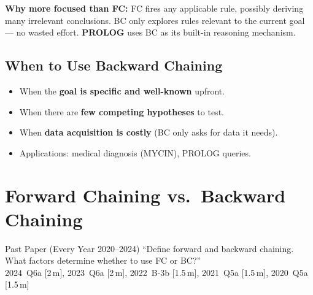 \documentclass[12pt,a4paper]{article}
\begin{document}
\textbf{Why more focused than FC:}
FC fires any applicable rule, possibly deriving many irrelevant conclusions.
BC only explores rules relevant to the current goal --- no wasted effort.
\textbf{PROLOG} uses BC as its built-in reasoning mechanism.

\subsection{When to Use Backward Chaining}

\begin{itemize}
  \item When the \textbf{goal is specific and well-known} upfront.
  \item When there are \textbf{few competing hypotheses} to test.
  \item When \textbf{data acquisition is costly} (BC only asks for data it needs).
  \item Applications: medical diagnosis (MYCIN), PROLOG queries.
\end{itemize}

\section{Forward Chaining vs.\ Backward Chaining}

\begin{exambox}{Past Paper (Every Year 2020--2024)}
``Define forward and backward chaining. What factors determine whether to use FC or BC?''\\
2024~Q6a [2\,m], 2023~Q6a [2\,m], 2022~B-3b [1.5\,m], 2021~Q5a [1.5\,m], 2020~Q5a [1.5\,m]
\end{exambox}
\end{document}
